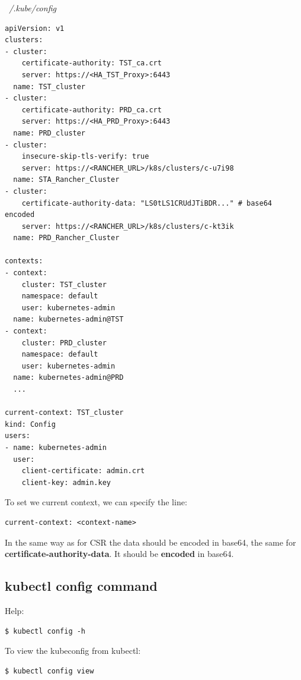 \documentclass{article}
\newenvironment{blocktemplateIII}[1]{%
    \tcolorbox[beamer,%
    noparskip,breakable,
    ,colframe=Red,%
    colbacklower=LimeGreen!75!LightGreen,%
    title=#1]}%
    {\endtcolorbox}
\newenvironment{codetemplate}[1][]{%
  \mybasecolorbox[#1]
  \itshape
}{%
  \endmybasecolorbox
}
\begin{document}
\begin{codetemplate}{~/.kube/config}
\begin{verbatim}
apiVersion: v1
clusters:
- cluster:
    certificate-authority: TST_ca.crt
    server: https://<HA_TST_Proxy>:6443
  name: TST_cluster
- cluster:
    certificate-authority: PRD_ca.crt
    server: https://<HA_PRD_Proxy>:6443
  name: PRD_cluster
- cluster:
    insecure-skip-tls-verify: true
    server: https://<RANCHER_URL>/k8s/clusters/c-u7i98
  name: STA_Rancher_Cluster
- cluster:
    certificate-authority-data: "LS0tLS1CRUdJTiBDR..." # base64 encoded
    server: https://<RANCHER_URL>/k8s/clusters/c-kt3ik
  name: PRD_Rancher_Cluster

contexts:
- context:
    cluster: TST_cluster
    namespace: default
    user: kubernetes-admin
  name: kubernetes-admin@TST
- context:
    cluster: PRD_cluster
    namespace: default
    user: kubernetes-admin
  name: kubernetes-admin@PRD
  ...

current-context: TST_cluster
kind: Config
users:
- name: kubernetes-admin
  user:
    client-certificate: admin.crt
    client-key: admin.key
\end{verbatim}
\end{codetemplate}

To set we current context, we can specify the line:
\begin{codetemplate}{}
\begin{verbatim}
current-context: <context-name>
\end{verbatim}
\end{codetemplate}

\begin{blocktemplateIII}{WARNING}
In the same way as for CSR the data should be encoded in base64, the same for \textbf{certificate-authority-data}. It should be \textbf{encoded} in base64.
\end{blocktemplateIII}

\subsection{kubectl config command}
Help:
\begin{codetemplate}{}
\begin{verbatim}
$ kubectl config -h
\end{verbatim}
\end{codetemplate}

To view the kubeconfig from kubectl:
\begin{codetemplate}{}
\begin{verbatim}
$ kubectl config view
\end{verbatim}
\end{codetemplate}
\end{document}
